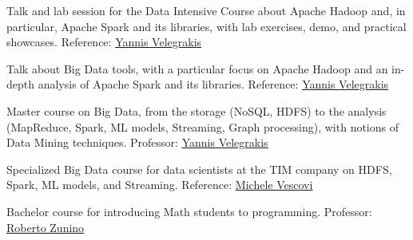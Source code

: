 \documentclass[10pt,a4paper,colorlinks,linkcolor=true]{moderncv}
\newcommand{\cvlink}[2]{\href{#1}{\ul{#2}}}
\begin{document}
  {Talk and lab session for the Data Intensive Course about Apache Hadoop and, in particular, Apache Spark and its libraries, with lab exercises, demo, and practical showcases. Reference: \cvlink{https://scholar.google.it/citations?user=FI1rYesAAAAJ}{Yannis Velegrakis}}

  {Talk about Big Data tools, with a particular focus on Apache Hadoop and an in-depth analysis of Apache Spark and its libraries. Reference: \cvlink{https://scholar.google.it/citations?user=FI1rYesAAAAJ}{Yannis Velegrakis}}

  {Master course on Big Data, from the storage (NoSQL, HDFS) to the analysis (MapReduce, Spark, ML models, Streaming, Graph processing), with notions of Data Mining techniques. Professor: \cvlink{https://scholar.google.it/citations?user=FI1rYesAAAAJ}{Yannis Velegrakis}}

  {Specialized Big Data course for data scientists at the TIM company on HDFS, Spark, ML models, and Streaming. Reference: \cvlink{https://www.linkedin.com/in/michele-vescovi/}{Michele Vescovi}}

  {Bachelor course for introducing Math students to programming. Professor: \cvlink{https://scholar.google.it/citations?user=ojru0uEAAAAJ}{Roberto Zunino}}



\end{document}
